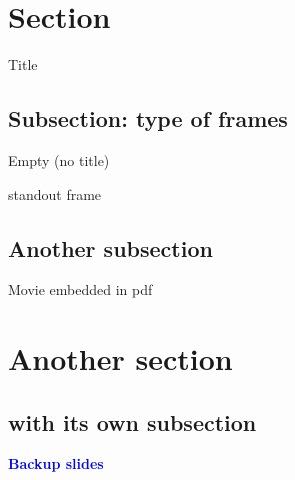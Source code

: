 \documentclass[xcolor=dvipsnames,professionalfonts, aspectratio=169]{beamer}
\begin{document}
\graphicspath{{./fig_slides/}}

\section{Section}
\begin{frame}{Title}

\end{frame}

\subsection{Subsection: type of frames}
\begin{frame}[plain]
  \begin{center}
    Empty (no title)
  \end{center}
\end{frame}


\begin{frame}[standout]{standout frame}
\end{frame}

\subsection{Another subsection}
\begin{frame}{Movie embedded in pdf}


\end{frame}

\section{Another section}
\subsection{with its own subsection}
\begin{frame}

\end{frame}

\begin{frame}

\end{frame}

\appendix

\begin{frame}[standout]
  \begin{center}
    \Large \bf
    \textcolor{Blue}{Backup slides}
  \end{center}
\end{frame}
\end{document}
